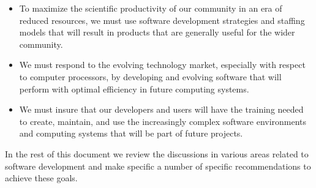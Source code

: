 \begin{itemize}
\item To maximize the scientific productivity of our community
in an era of reduced resources, we must use
software development strategies and staffing models that will result in products
that are generally useful for the wider \HEP community.
\item We must respond to the evolving technology market, especially
with respect to computer processors, by
developing and evolving software that will perform with optimal efficiency
in future computing systems.
\item We must insure that our developers and users will have the
training needed to create, maintain, and use the increasingly complex software
environments and computing systems that will be part of future \HEP projects.
\end{itemize}


In the rest of this document we review the discussions in various 
areas related to software development and make specific a
number of specific recommendations to achieve these goals.





